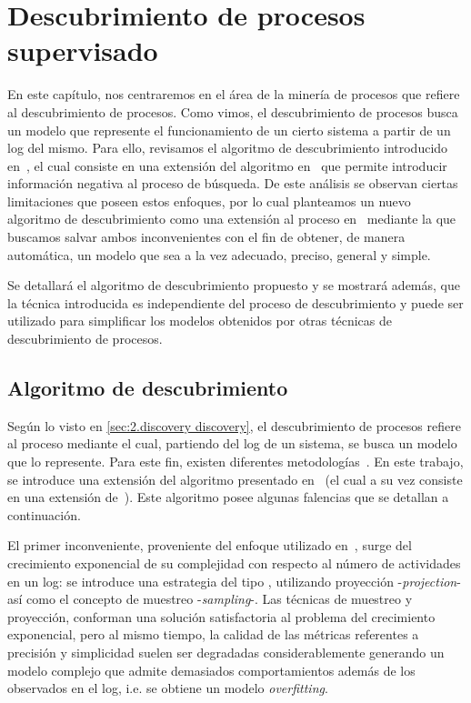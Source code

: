 \chapter{Descubrimiento de procesos supervisado}
\label{chap:3}

En este capítulo, nos centraremos en el área de la minería de procesos que refiere
al descubrimiento de procesos. Como vimos, el descubrimiento de procesos busca un modelo 
que represente el funcionamiento de un cierto sistema a partir de un log del mismo.
Para ello, revisamos el algoritmo de descubrimiento introducido en~\cite{LeonCB15},
el cual consiste en una extensión del algoritmo en~\cite{CarmonaC14} que permite 
introducir información negativa al proceso de búsqueda. De este análisis se observan 
ciertas limitaciones que poseen estos enfoques, por lo cual planteamos un nuevo 
algoritmo de descubrimiento como una extensión al proceso en~\cite{LeonCB15} mediante 
la que buscamos salvar ambos inconvenientes con el fin de obtener, de manera automática, 
un modelo que sea a la vez adecuado, preciso, general y simple.

Se detallará el algoritmo de descubrimiento propuesto y se mostrará además,
que la técnica introducida es independiente del proceso de descubrimiento
y puede ser utilizado para simplificar los modelos obtenidos por otras técnicas 
de descubrimiento de procesos.

\section{Algoritmo de descubrimiento}
\label{sec:3.algodisco}

Según lo visto en \autoref{sec:2.discovery discovery}, el descubrimiento de procesos
refiere al proceso mediante el cual, partiendo del log de un sistema, se busca
un modelo que lo represente.
Para este fin, existen diferentes metodologías~\cite{CarmonaC14,LeonCB15,MedeirosAW03,AalstWM04}.
En este trabajo, se introduce una extensión del algoritmo presentado en~\cite{LeonCB15} (el cual a
su vez consiste en una extensión de~\cite{CarmonaC14}). Este algoritmo posee algunas falencias
que se detallan a continuación.

El primer inconveniente, proveniente del enfoque utilizado en~\cite{CarmonaC14}, 
surge del crecimiento exponencial de su complejidad con respecto al número de actividades 
en un log: se introduce una estrategia del tipo , 
utilizando proyección -\textit{projection}- así como el concepto de muestreo -\textit{sampling}-.
Las técnicas de muestreo y proyección, conforman una solución satisfactoria al problema del
crecimiento exponencial, pero al mismo tiempo, la calidad de las métricas referentes a 
precisión y simplicidad suelen ser degradadas considerablemente generando un modelo complejo
que admite demasiados comportamientos además de los observados en el log, 
i.e. se obtiene un modelo \textit{overfitting}.

